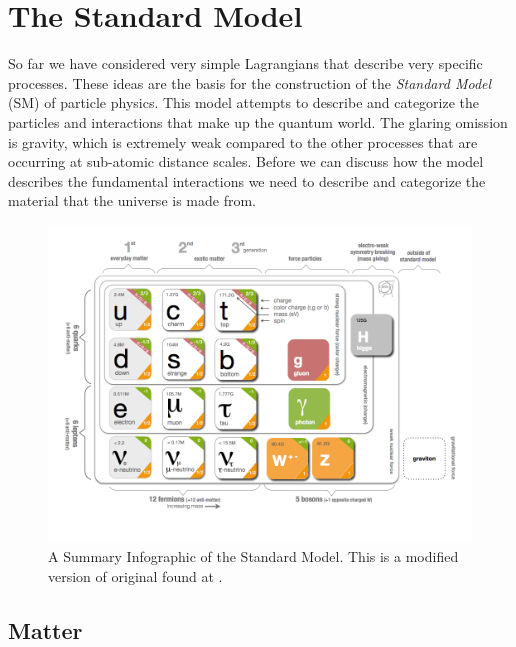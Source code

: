 \section{The Standard Model}
\label{sec:TheSM}
So far we have considered very simple Lagrangians that describe very specific processes. These ideas are the basis for the construction of the \textit{Standard Model} (SM) \cite{StandardModel67_1,StandardModel67_2,StandardModel67_3,StandardModel67_4} of particle physics. This model attempts to describe and categorize the particles and interactions that make up the quantum world. The glaring omission is gravity, which is extremely weak compared to the other processes that are occurring at sub-atomic distance scales. Before we can discuss how the model describes the fundamental interactions we need to describe and categorize the material that the universe is made from.

\begin{figure}
\begin{center}
\includegraphics[width=\linewidth]{Introduction/SMinfographic_image.png}
\caption[A Summary Infographic of The Standard Model.]{A Summary Infographic of the Standard Model. This is a modified version of original found at \cite{SMinfo:2012sm}.}
\label{fig:TheSM}
\end{center}
\end{figure}

\subsection{Matter}
\label{sec:TheMatter}


